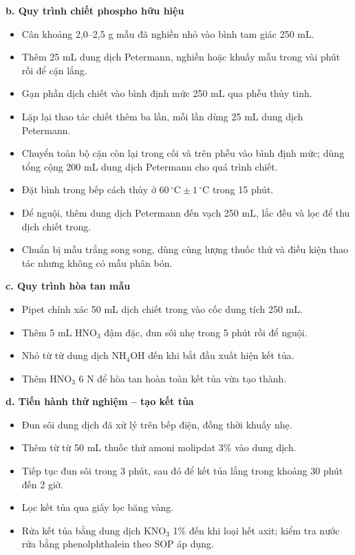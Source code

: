 \noindent\textbf{b. Quy trình chiết phospho hữu hiệu}
\begin{itemize}
  \item Cân khoảng 2,0--2,5 g mẫu đã nghiền nhỏ vào bình tam giác 250 mL.
  \item Thêm 25 mL dung dịch Petermann, nghiền hoặc khuấy mẫu trong vài phút rồi để cặn lắng.
  \item Gạn phần dịch chiết vào bình định mức 250 mL qua phễu thủy tinh.
  \item Lặp lại thao tác chiết thêm ba lần, mỗi lần dùng 25 mL dung dịch Petermann.
  \item Chuyển toàn bộ cặn còn lại trong cối và trên phễu vào bình định mức; dùng tổng cộng 200 mL dung dịch Petermann cho quá trình chiết.
  \item Đặt bình trong bếp cách thủy ở $60\,^{\circ}\mathrm{C} \pm 1\,^{\circ}\mathrm{C}$ trong 15 phút.
  \item Để nguội, thêm dung dịch Petermann đến vạch 250 mL, lắc đều và lọc để thu dịch chiết trong.
  \item Chuẩn bị mẫu trắng song song, dùng cùng lượng thuốc thử và điều kiện thao tác nhưng không có mẫu phân bón.
\end{itemize}

\noindent\textbf{c. Quy trình hòa tan mẫu}
\begin{itemize}
  \item Pipet chính xác 50 mL dịch chiết trong vào cốc dung tích 250 mL.
  \item Thêm 5 mL \(\mathrm{HNO_3}\) đậm đặc, đun sôi nhẹ trong 5 phút rồi để nguội.
  \item Nhỏ từ từ dung dịch \(\mathrm{NH_4OH}\) đến khi bắt đầu xuất hiện kết tủa.
  \item Thêm \(\mathrm{HNO_3}\) 6 N để hòa tan hoàn toàn kết tủa vừa tạo thành.
\end{itemize}

\noindent\textbf{d. Tiến hành thử nghiệm -- tạo kết tủa}
\begin{itemize}
  \item Đun sôi dung dịch đã xử lý trên bếp điện, đồng thời khuấy nhẹ.
  \item Thêm từ từ 50 mL thuốc thử amoni molipdat 3\% vào dung dịch.
  \item Tiếp tục đun sôi trong 3 phút, sau đó để kết tủa lắng trong khoảng 30 phút đến 2 giờ.
  \item Lọc kết tủa qua giấy lọc băng vàng.
  \item Rửa kết tủa bằng dung dịch \(\mathrm{KNO_3}\) 1\% đến khi loại hết axit; kiểm tra nước rửa bằng phenolphthalein theo SOP áp dụng.
\end{itemize}

